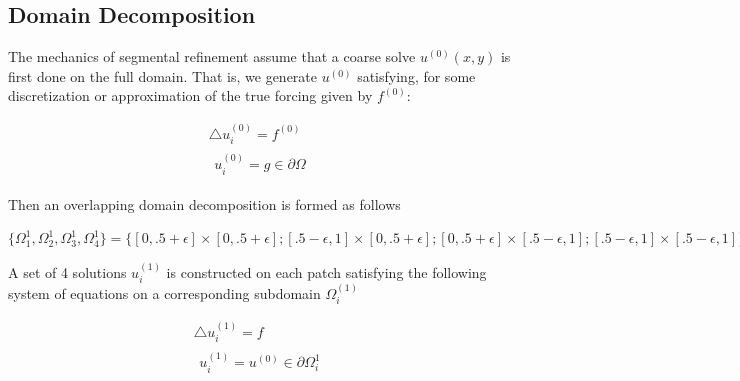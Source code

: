 \documentclass[final]{siamart1116}
\numberwithin{theorem}{section}
\begin{document}
\subsection{Domain Decomposition}

The mechanics of segmental refinement assume that a coarse solve $u^{(0)}(x, y) $ is first done on the full domain. That is, we generate $u^{(0)}$ satisfying, for some discretization or approximation of the true forcing given by $f^{(0)}$:


\begin{gather}
  \bigtriangleup u^{(0)}_i = f^{(0)} \nonumber \\
  \begin{split}
    u^{(0)}_i = g \in \partial \Omega \label{fullpde}
  \end{split}
\end{gather}


Then an overlapping domain decomposition is formed as follows


$\{ \Omega^{1}_1, \Omega^{1}_2, \Omega^{1}_3, \Omega^{1}_4 \} = \{[0,  .5 + \epsilon] \times [0, .5 + \epsilon] ; [.5-\epsilon, 1] \times  [0, .5+\epsilon] ; [0, .5+\epsilon] \times  [.5-\epsilon, 1] ; [.5-\epsilon, 1] \times  [.5-\epsilon, 1] \}$




A set of 4 solutions $u^{(1)}_i$ is constructed on each patch satisfying the following system of equations on a corresponding subdomain  $\Omega^{(1)}_i$

\begin{gather}
  \bigtriangleup u^{(1)}_i = f \nonumber \\
  \begin{split}
    u^{(1)}_i = u^{(0)} \in \partial \Omega^{1}_i \label{patchpde1}
  \end{split}
\end{gather}
\end{document}

